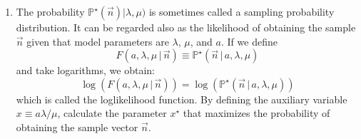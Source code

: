 \documentclass[11pt]{article}
\newcommand{\Pb}{{\mathbb P}}
\newenvironment{problem}[2][Problem]{\begin{trivlist}
\item[\hskip \labelsep {\bfseries #1}\hskip \labelsep {\bfseries #2.}]}{\end{trivlist}}
\newenvironment{solution}{\begin{proof}[Solution]}{\end{proof}}
\begin{document}
\begin{enumerate}
\item The probability $\Pb^{\star}(\vec{n}) | \lambda, \mu)$ is sometimes called a sampling probability distribution. It can be regarded also as the likelihood of obtaining the sample $\vec{n}$ given that model parameters are $\lambda$, $\mu$, and $a$. If we define 
\begin{equation}
  F(a, \lambda, \mu \,|\, \vec{n}) \equiv \Pb^{\star}(\vec{n} \,|\, a, \lambda, \mu) 
\end{equation}
and take logarithms, we obtain: 
\begin{equation}
  \log \left( F(a, \lambda, \mu \,|\, \vec{n} ) \right) = \log \left( \Pb^{\star}(\vec{n} \,|\, a, \lambda, \mu) \right) 
%
\end{equation}
which is called the loglikelihood function. By defining the auxiliary variable $x \equiv a \lambda/\mu$, calculate the parameter $x^{\star}$ that maximizes the probability of obtaining the sample vector $\vec{n}$. 
\end{enumerate}












\end{document}

